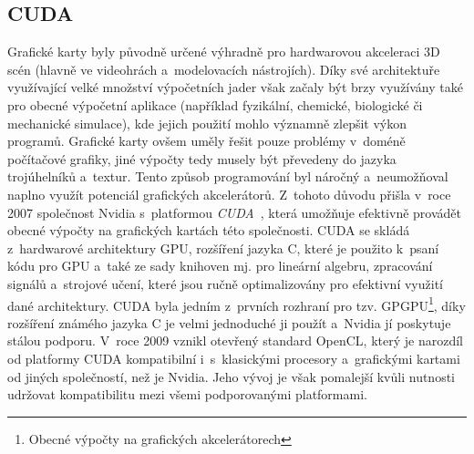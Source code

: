 \subsection{CUDA}
Grafické karty byly původně určené výhradně pro hardwarovou akceleraci 3D scén (hlavně ve videohrách a~modelovacích nástrojích). Díky své architektuře využívající velké množství výpočetních jader však začaly být brzy využívány také pro obecné výpočetní aplikace (například fyzikální, chemické, biologické či mechanické simulace), kde jejich použití mohlo významně zlepšit výkon programů. Grafické karty ovšem uměly řešit pouze problémy v~doméně počítačové grafiky, jiné výpočty tedy musely být převedeny do jazyka trojúhelníků a~textur. Tento způsob programování byl náročný a~neumožňoval naplno využít potenciál grafických akcelerátorů. Z~tohoto důvodu přišla v~roce 2007 společnost Nvidia s~platformou \emph{CUDA}~\cite{cuda}, která umožňuje efektivně provádět obecné výpočty na grafických kartách této společnosti. CUDA se skládá z~hardwarové architektury GPU, rozšíření jazyka C, které je použito k~psaní kódu pro GPU a~také ze sady knihoven mj. pro lineární algebru, zpracování signálů a~strojové učení, které jsou ručně optimalizovány pro efektivní využití dané architektury. CUDA byla jedním z~prvních rozhraní pro tzv. GPGPU\footnote{Obecné výpočty na grafických akcelerátorech}, díky rozšíření známého jazyka C je velmi jednoduché ji použít a~Nvidia jí poskytuje stálou podporu. V~roce 2009 vznikl otevřený standard OpenCL, který je narozdíl od platformy CUDA kompatibilní i~s~klasickými procesory a~grafickými kartami od jiných společností, než je Nvidia. Jeho vývoj je však pomalejší kvůli nutnosti udržovat kompatibilitu mezi všemi podporovanými platformami.

